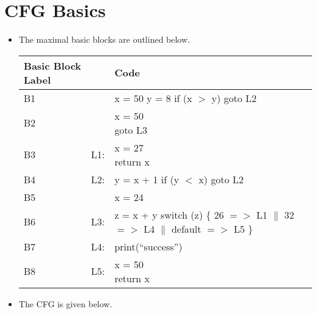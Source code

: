 \section{CFG Basics}

\begin{itemize}
 
\item The maximal basic blocks are outlined below. 


\begin{table}[!ht]
\centering
\begin{tabular}{l l l }
  \toprule
  \toprule
Basic Block Label & & Code \\
\midrule
B1 & & \shortstack[l]{x = 50 \\ y = 8 \\ if (x $>$ y) goto L2} \\
\midrule
B2 & & \shortstack[l]{x = 50 \\ goto L3} \\
\midrule
B3 & L1: & \shortstack[l]{x = 27 \\ return x}\\
\midrule
B4 & L2: & \shortstack[l]{y = x + 1 \\ if (y $<$ x) goto L2}\\
\midrule
B5 &  & x = 24\\
\midrule
B6 & L3: & \shortstack[l]{z = x + y \\ switch (z) \{ 26 $=>$ L1 $\|$ 32 $=>$ L4 $\|$ default $=>$ L5 \} } \\
\midrule
B7 & L4: & print(``success'') \\
\midrule
B8 & L5: & \shortstack[l]{x = 50\\return x}\\
\bottomrule
\end{tabular}
\end{table}

\item The CFG is given below.
  

\end{itemize}
